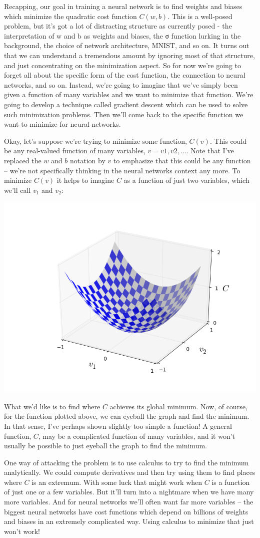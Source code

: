 \documentclass[a4paper,twoside,10pt]{book}
\begin{document}
Recapping, our goal in training a neural network is to find weights and biases which minimize the quadratic cost function $C(w,b)$. This is a well-posed problem, but it's got a lot of distracting structure as currently posed - the interpretation of w and b as weights and biases, the σ function lurking in the background, the choice of network architecture, MNIST, and so on. It turns out that we can understand a tremendous amount by ignoring most of that structure, and just concentrating on the minimization aspect. So for now we're going to forget all about the specific form of the cost function, the connection to neural networks, and so on. Instead, we're going to imagine that we've simply been given a function of many variables and we want to minimize that function. We're going to develop a technique called gradient descent which can be used to solve such minimization problems. Then we'll come back to the specific function we want to minimize for neural networks.

Okay, let's suppose we're trying to minimize some function, $C(v)$. This could be any real-valued function of many variables, $v=v1,v2,\ldots$. Note that I've replaced the $w$ and $b$ notation by $v$ to emphasize that this could be any function -- we're not specifically thinking in the neural networks context any more. To minimize $C(v)$ it helps to imagine $C$ as a function of just two variables, which we'll call $v_1$ and $v_2$:
\begin{center}
	\includegraphics[width=0.5\linewidth]{./figures/ch1/valley}
\end{center}

What we'd like is to find where $C$ achieves its global minimum. Now, of course, for the function plotted above, we can eyeball the graph and find the minimum. In that sense, I've perhaps shown slightly too simple a function! A general function, $C$, may be a complicated function of many variables, and it won't usually be possible to just eyeball the graph to find the minimum.

One way of attacking the problem is to use calculus to try to find the minimum analytically. We could compute derivatives and then try using them to find places where $C$ is an extremum. With some luck that might work when $C$ is a function of just one or a few variables. But it'll turn into a nightmare when we have many more variables. And for neural networks we'll often want far more variables -- the biggest neural networks have cost functions which depend on billions of weights and biases in an extremely complicated way. Using calculus to minimize that just won't work!
\end{document}
